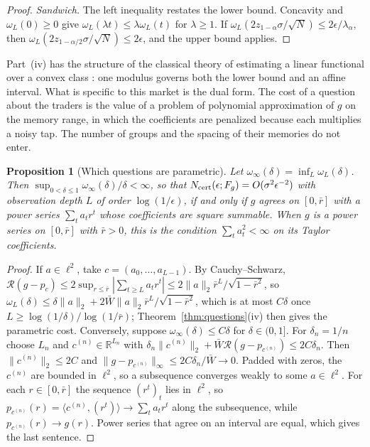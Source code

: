 \documentclass[12pt]{article}
\newtheorem{proposition}[theorem]{Proposition}
\theoremstyle{definition}
\theoremstyle{remark}
\begin{document}
\begin{proof}
\emph{Sandwich.} The left inequality restates the lower bound. Concavity and $\omega_L(0)\ge0$ give $\omega_L(\lambda t)\le\lambda\omega_L(t)$ for $\lambda\ge1$. If $\omega_L(2z_{1-\alpha}\sigma/\sqrt N)\le2\epsilon/\lambda_\alpha$, then $\omega_L(2z_{1-\alpha/2}\sigma/\sqrt N)\le2\epsilon$, and the upper bound applies.
\end{proof}

Part~(iv) has the structure of the classical theory of estimating a linear functional over a convex class \citep{donoho1994}: one modulus governs both the lower bound and an affine interval. What is specific to this market is the dual form. The cost of a question about the traders is the value of a problem of polynomial approximation of $g$ on the memory range, in which the coefficients are penalized because each multiplies a noisy tap. The number of groups and the spacing of their memories do not enter.

\begin{proposition}[Which questions are parametric]\label{prop:parametric}
Let $\omega_\infty(\delta)=\inf_L\omega_L(\delta)$. Then $\sup_{0<\delta\le1}\omega_\infty(\delta)/\delta<\infty$, so that $N_{\rm cert}(\epsilon;F_g)=O(\sigma^2\epsilon^{-2})$ with observation depth $L$ of order $\log(1/\epsilon)$, if and only if $g$ agrees on $[0,\bar r]$ with a power series $\sum_ta_tr^t$ whose coefficients are square summable. When $g$ is a power series on $[0,\bar r]$ with $\bar r>0$, this is the condition $\sum_ta_t^2<\infty$ on its Taylor coefficients.
\end{proposition}

\begin{proof}
If $a\in\ell^2$, take $c=(a_0,\ldots,a_{L-1})$. By Cauchy--Schwarz, $\mathcal R(g-p_c)\le2\sup_{r\le\bar r}|\sum_{t\ge L}a_tr^t|\le2\|a\|_2\bar r^L/\sqrt{1-\bar r^2}$, so $\omega_L(\delta)\le\delta\|a\|_2+2\bar W\|a\|_2\bar r^L/\sqrt{1-\bar r^2}$, which is at most $C\delta$ once $L\ge\log(1/\delta)/\log(1/\bar r)$; Theorem~\ref{thm:questions}(iv) then gives the parametric cost. Conversely, suppose $\omega_\infty(\delta)\le C\delta$ for $\delta\in(0,1]$. For $\delta_n=1/n$ choose $L_n$ and $c^{(n)}\in\mathbb R^{L_n}$ with $\delta_n\|c^{(n)}\|_2+\bar W\mathcal R(g-p_{c^{(n)}})\le2C\delta_n$. Then $\|c^{(n)}\|_2\le2C$ and $\|g-p_{c^{(n)}}\|_\infty\le2C\delta_n/\bar W\to0$. Padded with zeros, the $c^{(n)}$ are bounded in $\ell^2$, so a subsequence converges weakly to some $a\in\ell^2$. For each $r\in[0,\bar r]$ the sequence $(r^t)_t$ lies in $\ell^2$, so $p_{c^{(n)}}(r)=\langle c^{(n)},(r^t)\rangle\to\sum_ta_tr^t$ along the subsequence, while $p_{c^{(n)}}(r)\to g(r)$. Power series that agree on an interval are equal, which gives the last sentence.
\end{proof}
\end{document}
